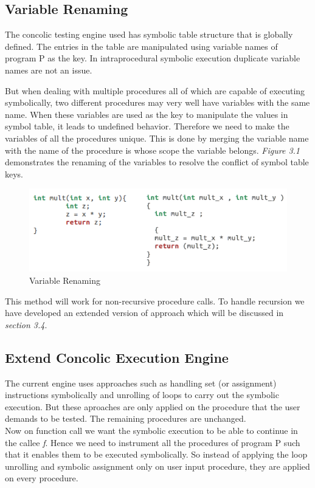 \documentclass[12pt,oneside]{book}
\begin{document}
\subsection{Variable Renaming}
The concolic testing engine used has symbolic table structure that is globally defined. The entries in the table are manipulated using variable names of program P as the key. In intraprocedural symbolic execution duplicate variable names are not an issue.

But when dealing with multiple procedures all of which are capable of executing symbolically, two different procedures may very well have variables with the same name. When these variables are used as the key to manipulate the values in symbol table, it leads to undefined behavior. Therefore we need to make the variables of all the procedures unique. This is done by merging the variable name with the name of the procedure is whose scope the variable belongs. \textit{Figure 3.1} demonstrates the renaming of the variables to resolve the conflict of symbol table keys. \\

\begin{figure}[htbp]
\centering
\includegraphics[scale=0.45]{renamed1.png}
\caption{Variable Renaming}
\end{figure}  

This method will work for non-recursive procedure calls. To handle recursion we have developed an extended version of approach which will be discussed in \textit{section 3.4}.\\


\subsection{Extend Concolic Execution Engine}
The current engine uses approaches such as handling set (or assignment) instructions symbolically and unrolling of loops to carry out the symbolic execution. But these aproaches are only applied on the procedure that the user demands to be tested. The remaining procedures are unchanged.\\
Now on function call we want the symbolic execution to be able to continue in the callee \textit{f}. Hence we need to instrument all the procedures of program P such that it enables them to be executed symbolically. So instead of applying the loop unrolling and symbolic assignment only on user input procedure, they are applied on every procedure.
\end{document}
